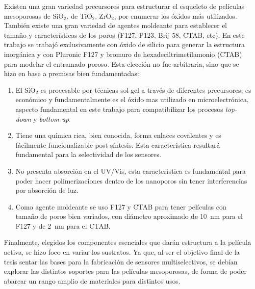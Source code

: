 	Existen una gran variedad precursores para estructurar el esqueleto de películas mesoporosas de SiO$_2$, de TiO$_2$, ZrO$_2$, por enumerar los  óxidos más utilizados. También existe una gran variedad de agentes moldeante para establecer el tamaño y características de los poros (F127, P123, Brij 58, CTAB, etc). En este trabajo se trabajó exclusivamente con óxido de silicio para generar la estructura inorgánica y con Pluronic F127 y bromuro de hexadeciltrimetilamonio (CTAB) para modelar el entramado poroso. Esta elección no fue arbitraria, sino que se hizo en base a premisas bien fundamentadas:
		\begin{enumerate}

		\item El SiO$_2$ es procesable por técnicas sol-gel a través de diferentes precursores, es económico y fundamentalmente es el óxido mas utilizado en microelectrónica, aspecto fundamental en este trabajo para compatibilizar los procesos \textit{top-down} y \textit{bottom-up}.

		\item Tiene una química rica, bien conocida, forma enlaces covalentes y es fácilmente funcionalizable post-síntesis. Esta característica resultará fundamental para la selectividad de los sensores.

		\item No presenta absorción en el UV/Vis, esta característica es fundamental para poder hacer polimerizaciones dentro de los nanoporos sin tener interferencias por absorción de luz.

		\item Como agente moldeante se uso F127 y CTAB para tener películas con tamaño de poros bien variados, con diámetro aproximado de \SI{10}{\nm} para el F127 y de \SI{2}{\nm} para el CTAB.

		\end{enumerate}
	
	Finalmente, elegidos los componentes esenciales que darán estructura a la película activa, se hizo foco en variar los sustratos. Ya que, al ser el objetivo final de la tesis sentar las bases para la fabricación de sensores multiselectivos, se debían explorar las distintos soportes para las películas mesoporosas, de forma de poder abarcar un rango amplio de materiales para distintos usos.

